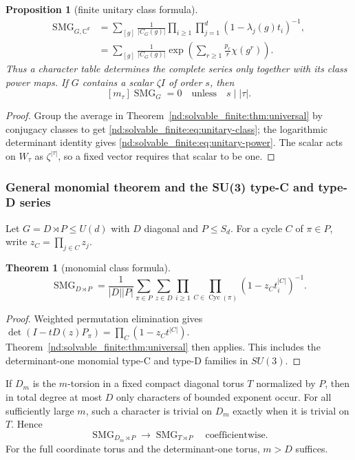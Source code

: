\documentclass[10pt]{article}
\newcommand{\SMG}{\operatorname{SMG}}
\newcommand{\MGF}{\SMG}
\newcommand{\C}{\mathbb C}
\newcommand{\Cyc}{\operatorname{Cyc}}
\newtheorem{theorem}{Theorem}
\newtheorem{proposition}{Proposition}
\begin{document}
\begin{proposition}[finite unitary class formula]\label{nd:solvable_finite:prop:unitary-class}
\begin{align}
 \MGF_{G,\C^d}
 &=\boxed{\sum_{[g]}\frac1{|C_G(g)|}
 \prod_{i\geq1}\prod_{j=1}^d(1-\lambda_j(g)t_i)^{-1}},
 \label{nd:solvable_finite:eq:unitary-class}\\
 &=\sum_{[g]}\frac1{|C_G(g)|}
 \exp\!\left(\sum_{r\geq1}\frac{p_r}{r}\chi(g^r)\right).
 \label{nd:solvable_finite:eq:unitary-power}
\end{align}
Thus a character table determines the complete series only together with its
class power maps.  If $G$ contains a scalar $\zeta I$ of order $s$, then
\[
 [m_\tau]\MGF_G=0\quad\text{unless}\quad s\mid|\tau|.
 \label{nd:solvable_finite:eq:scalar-selection}
\]
\end{proposition}

\begin{proof}
Group the average in Theorem~\ref{nd:solvable_finite:thm:universal} by conjugacy classes to get
\eqref{nd:solvable_finite:eq:unitary-class}; the logarithmic determinant identity gives
\eqref{nd:solvable_finite:eq:unitary-power}.  The scalar acts on $W_\tau$ as
$\zeta^{|\tau|}$, so a fixed vector requires that scalar to be one.
\end{proof}

\subsubsection{General monomial theorem and the SU(3) type-C and type-D series}

Let $G=D\rtimes P\leq U(d)$ with $D$ diagonal and $P\leq S_d$.  For a
cycle $C$ of $\pi\in P$, write $z_C=\prod_{j\in C}z_j$.

\begin{theorem}[monomial class formula]\label{nd:solvable_finite:thm:monomial}
\[
 \boxed{\MGF_{D\rtimes P}
 =\frac1{|D||P|}\sum_{\pi\in P}\sum_{z\in D}
 \prod_{i\geq1}\prod_{C\in\Cyc(\pi)}
 (1-z_Ct_i^{|C|})^{-1}.}
\]
\end{theorem}

\begin{proof}
Weighted permutation elimination gives
$\det(I-tD(z)P_\pi)=\prod_C(1-z_Ct^{|C|})$.  Theorem~\ref{nd:solvable_finite:thm:universal}
then applies.  This includes the determinant-one monomial type-C and type-D
families in $SU(3)$.
\end{proof}

If $D_m$ is the $m$-torsion in a fixed compact diagonal torus $T$ normalized
by $P$, then in total degree at most $D$ only characters of bounded exponent
occur.  For all sufficiently large $m$, such a character is trivial on
$D_m$ exactly when it is trivial on $T$.  Hence
\[
 \MGF_{D_m\rtimes P}\longrightarrow\MGF_{T\rtimes P}
 \quad\text{coefficientwise}.
\]
For the full coordinate torus and the determinant-one torus, $m>D$ suffices.
\end{document}
